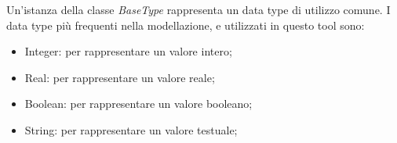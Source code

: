 
Un'istanza della classe \textit{BaseType} rappresenta un data type di utilizzo comune. I data type più frequenti nella modellazione, e utilizzati in questo tool sono:
\begin{itemize}
	\item Integer: per rappresentare un valore intero;
	\item Real: per rappresentare un valore reale;
	\item Boolean: per rappresentare un valore booleano;
	\item String: per rappresentare un valore testuale;
\end{itemize}